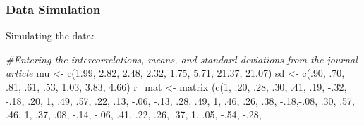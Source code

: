 \documentclass[
  english,
]{book}
\newenvironment{Shaded}{\begin{snugshade}}{\end{snugshade}}
\newcommand{\CommentTok}[1]{\textcolor[rgb]{0.56,0.35,0.01}{\textit{#1}}}
\newcommand{\DecValTok}[1]{\textcolor[rgb]{0.00,0.00,0.81}{#1}}
\newcommand{\FloatTok}[1]{\textcolor[rgb]{0.00,0.00,0.81}{#1}}
\newcommand{\FunctionTok}[1]{\textcolor[rgb]{0.00,0.00,0.00}{#1}}
\newcommand{\NormalTok}[1]{#1}
\newcommand{\OtherTok}[1]{\textcolor[rgb]{0.56,0.35,0.01}{#1}}
\newcommand{\SpecialCharTok}[1]{\textcolor[rgb]{0.00,0.00,0.00}{#1}}
\begin{document}
\hypertarget{data-simulation-1}{%
\subsubsection{Data Simulation}\label{data-simulation-1}}

Simulating the data:

\begin{Shaded}
\begin{Highlighting}[]
\CommentTok{\#Entering the intercorrelations, means, and standard deviations from the journal article}
\NormalTok{mu }\OtherTok{\textless{}{-}} \FunctionTok{c}\NormalTok{(}\FloatTok{1.99}\NormalTok{, }\FloatTok{2.82}\NormalTok{, }\FloatTok{2.48}\NormalTok{, }\FloatTok{2.32}\NormalTok{, }\FloatTok{1.75}\NormalTok{, }\FloatTok{5.71}\NormalTok{, }\FloatTok{21.37}\NormalTok{, }\FloatTok{21.07}\NormalTok{)}
\NormalTok{sd }\OtherTok{\textless{}{-}} \FunctionTok{c}\NormalTok{(.}\DecValTok{90}\NormalTok{, .}\DecValTok{70}\NormalTok{, .}\DecValTok{81}\NormalTok{, .}\DecValTok{61}\NormalTok{, .}\DecValTok{53}\NormalTok{, }\FloatTok{1.03}\NormalTok{, }\FloatTok{3.83}\NormalTok{, }\FloatTok{4.66}\NormalTok{)}
\NormalTok{r\_mat }\OtherTok{\textless{}{-}} \FunctionTok{matrix}\NormalTok{ (}\FunctionTok{c}\NormalTok{(}\DecValTok{1}\NormalTok{, .}\DecValTok{20}\NormalTok{, .}\DecValTok{28}\NormalTok{, .}\DecValTok{30}\NormalTok{, .}\DecValTok{41}\NormalTok{, .}\DecValTok{19}\NormalTok{, }\SpecialCharTok{{-}}\NormalTok{.}\DecValTok{32}\NormalTok{, }\SpecialCharTok{{-}}\NormalTok{.}\DecValTok{18}\NormalTok{,}
\NormalTok{        .}\DecValTok{20}\NormalTok{, }\DecValTok{1}\NormalTok{, .}\DecValTok{49}\NormalTok{, .}\DecValTok{57}\NormalTok{, .}\DecValTok{22}\NormalTok{, .}\DecValTok{13}\NormalTok{, }\SpecialCharTok{{-}}\NormalTok{.}\DecValTok{06}\NormalTok{, }\SpecialCharTok{{-}}\NormalTok{.}\DecValTok{13}\NormalTok{,}
\NormalTok{        .}\DecValTok{28}\NormalTok{, .}\DecValTok{49}\NormalTok{, }\DecValTok{1}\NormalTok{, .}\DecValTok{46}\NormalTok{, .}\DecValTok{26}\NormalTok{, .}\DecValTok{38}\NormalTok{, }\SpecialCharTok{{-}}\NormalTok{.}\DecValTok{18}\NormalTok{,}\SpecialCharTok{{-}}\NormalTok{.}\DecValTok{08}\NormalTok{, }
\NormalTok{        .}\DecValTok{30}\NormalTok{, .}\DecValTok{57}\NormalTok{, .}\DecValTok{46}\NormalTok{,  }\DecValTok{1}\NormalTok{, .}\DecValTok{37}\NormalTok{, .}\DecValTok{08}\NormalTok{, }\SpecialCharTok{{-}}\NormalTok{.}\DecValTok{14}\NormalTok{, }\SpecialCharTok{{-}}\NormalTok{.}\DecValTok{06}\NormalTok{,}
\NormalTok{        .}\DecValTok{41}\NormalTok{, .}\DecValTok{22}\NormalTok{, .}\DecValTok{26}\NormalTok{, .}\DecValTok{37}\NormalTok{, }\DecValTok{1}\NormalTok{, .}\DecValTok{05}\NormalTok{, }\SpecialCharTok{{-}}\NormalTok{.}\DecValTok{54}\NormalTok{, }\SpecialCharTok{{-}}\NormalTok{.}\DecValTok{28}\NormalTok{, }

\end{Highlighting}
\end{Shaded}
\end{document}

